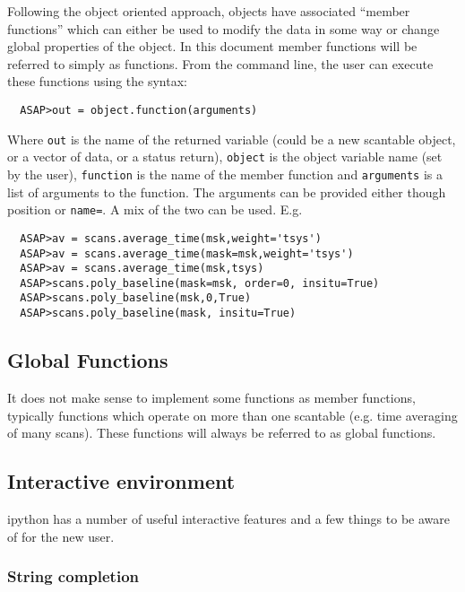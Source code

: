 \documentclass[11pt]{article}
\newcommand{\cmd}[1]{{\tt #1}}
\begin{document}
Following the object oriented approach,
objects have associated ``member functions'' which can either be used
to modify the data in some way or change global properties of the
object. In this document member functions will be referred to simply
as functions. From the command line, the user can execute these
functions using the syntax:
\begin{verbatim}
  ASAP>out = object.function(arguments)
\end{verbatim}

Where \cmd{out} is the name of the returned variable (could be a new
scantable object, or a vector of data, or a status return),
\cmd{object} is the object variable name (set by the user),
\cmd{function} is the name of the member function and \cmd{arguments}
is a list of arguments to the function. The arguments can be provided
either though position or \cmd{name=}.  A mix of the two can be used.
E.g.

\begin{verbatim}
  ASAP>av = scans.average_time(msk,weight='tsys')
  ASAP>av = scans.average_time(mask=msk,weight='tsys')
  ASAP>av = scans.average_time(msk,tsys)
  ASAP>scans.poly_baseline(mask=msk, order=0, insitu=True)
  ASAP>scans.poly_baseline(msk,0,True)
  ASAP>scans.poly_baseline(mask, insitu=True)
\end{verbatim}

\subsection{Global Functions}

It does not make sense to implement some functions as member
functions, typically functions which operate on more than one
scantable (e.g. time averaging of many scans). These functions will
always be referred to as global functions.

\subsection{Interactive environment}

ipython has a number of useful interactive
features and a few things to be aware of for the new user.

\subsubsection{String completion}
\end{document}
